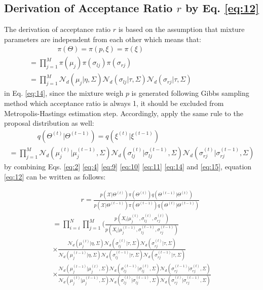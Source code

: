 \documentclass[conference]{llncs}
\begin{document}
\subsection{Derivation of Acceptance Ratio $r$ by Eq. \eqref{eq:12}}
The derivation of acceptance ratio $r$ is based on the assumption that mixture parameters are independent from each other which means that:
\begin{multline}
\qquad\qquad\pi(\Theta) = \pi(p,\xi) = \pi(\xi) \\
= \prod_{j=1}^M\pi(\mu_j)\pi(\sigma_{lj})\pi(\sigma_{rj}) \qquad\qquad\qquad\qquad\qquad\\
= \prod_{j=1}^M\mathcal{N}_d(\mu_j|\eta,\Sigma)\mathcal{N}_d(\sigma_{lj}|\tau,\Sigma)\mathcal{N}_d(\sigma_{rj}|\tau,\Sigma)\qquad\qquad\qquad
\label{eq:13}
\end{multline}
in Eq. \eqref{eq:14}, since the mixture weigh $p$ is generated following Gibbs sampling method which acceptance ratio is always 1, it should be excluded from Metropolis-Hastings estimation step. Accordingly, apply the same rule to the proposal distribution as well:
\begin{multline}
\qquad\qquad q(\Theta^{(t)}|\Theta^{(t-1)}) = q(\xi^{(t)}|\xi^{(t-1)}) \\
= \prod_{j=1}^M\mathcal{N}_d(\mu_j^{(t)}|\mu_j^{(t-1)},\Sigma)\mathcal{N}_d(\sigma_{lj}^{(t)}|\sigma_{lj}^{(t-1)},\Sigma)\mathcal{N}_d(\sigma_{rj}^{(t)}|\sigma_{rj}^{(t-1)},\Sigma)
\label{eq:14}
\end{multline}
by combining Eqs. \eqref{eq:2} \eqref{eq:4} \eqref{eq:9} \eqref{eq:10} \eqref{eq:11} \eqref{eq:14} and \eqref{eq:15}, equation \eqref{eq:12} can be written as follows:

\begin{multline}
\qquad\qquad r = \frac{p(\mathcal{X}|\Theta^{(t)})\pi(\Theta^{(t)})q(\Theta^{(t-1)}|\Theta^{(t)})}{p(\mathcal{X}|\Theta^{(t-1)})\pi(\Theta^{(t-1)})q(\Theta^{(t)}|\Theta^{(t-1)})} \\
= \prod_{i=i}^N \prod_{j=1}^M(\frac{p(X_i|\mu_j^{(t)},\sigma_{lj}^{(t)},\sigma_{rj}^{(t)})}
{p(X_i|\mu_j^{(t-1)},\sigma_{lj}^{(t-1)},\sigma_{rj}^{(t-1)})} \qquad\qquad\\
\times \frac{\mathcal{N}_d(\mu_j^{(t)}|\eta,\Sigma)\mathcal{N}_d(\sigma_{lj}^{(t)}|\tau,\Sigma)\mathcal{N}_d(\sigma_{rj}^{(t)}|\tau,\Sigma)}{\mathcal{N}_d(\mu_j^{(t-1)}|\eta,\Sigma)\mathcal{N}_d(\sigma_{lj}^{(t-1)}|\tau,\Sigma)\mathcal{N}_d(\sigma_{rj}^{(t-1)}|\tau,\Sigma)} \\
\times \frac{\mathcal{N}_d(\mu_j^{(t-1)}|\mu_j^{(t)},\Sigma)\mathcal{N}_d(\sigma_{lj}^{(t-1)}|\sigma_{lj}^{(t)},\Sigma)\mathcal{N}_d(\sigma_{rj}^{(t-1)}|\sigma_{rj}^{(t)},\Sigma)}{\mathcal{N}_d(\mu_j^{(t)}|\mu_j^{(t-1)},\Sigma)\mathcal{N}_d(\sigma_{lj}^{(t)}|\sigma_{lj}^{(t-1)},\Sigma)\mathcal{N}_d(\sigma_{rj}^{(t)}|\sigma_{rj}^{(t-1)},\Sigma)}
\label{eq:15}
\end{multline}
\end{document}
